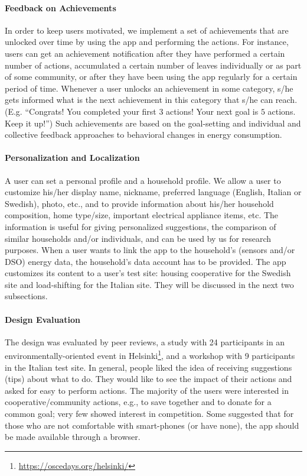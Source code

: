 \paragraph{Feedback on Achievements}
In order to keep users motivated, we implement a set of achievements that are unlocked over time by using the app and performing the actions. For instance, users can get an achievement notification after they have performed a certain number of actions, accumulated a certain number of leaves individually or as part of some community, or after they have been using the app regularly for a certain period of time. Whenever a user unlocks an achievement in some category, s/he gets informed what is the next achievement in this category that s/he can reach. (E.g. ``Congrats! You completed your first $3$ actions! Your next goal is $5$ actions. Keep it up!'') Such achievements are based on the goal-setting \citep{Abrahamse2007265} and individual and collective feedback \citep{Abrahamse2013} approaches to behavioral changes in energy consumption.

\paragraph{Personalization and Localization}
A user can set a personal profile and a household profile. We allow a user to customize his/her display name, nickname, preferred language (English, Italian or Swedish), photo, etc., and to provide information about his/her household composition, home type/size, important electrical appliance items, etc. The information is useful for giving personalized suggestions, the comparison of similar households and/or individuals, and can be used by us for research purposes. When a user wants to link the app to the household's (sensors and/or DSO) energy data, the household's data account has to be provided. 
% 
The app customizes its content to a user's test site: housing cooperative for the Swedish site and load-shifting for the Italian site. They will be discussed in the next two subsections. 




\paragraph{Design Evaluation}
The design was evaluated by peer reviews, a study with 24 participants in an environmentally-oriented event in Helsinki\footnote{\url{https://oscedays.org/helsinki/}}, and a workshop with 9 participants in the Italian test site. 
In general, people liked the idea of receiving suggestions (tips) about what to do. 
They would like to see the impact of their actions and asked for easy to perform actions. The majority of the users were interested in cooperative/community actions, e.g., to save together and to donate for a common goal; very few showed interest in competition. 
Some suggested that for those who are not comfortable with smart-phones (or have none), the app should be made available through a browser. 

